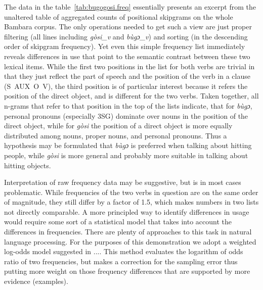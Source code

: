 \documentclass[12pt]{article}
\begin{document}
The data in the table~\ref{tab:bugogosi.freq} essentially presents an
excerpt from the unaltered table of aggregated counts of positional
skipgrams on the whole Bambara corpus. The only operations needed to
get such a view are just proper filtering (all lines including
\textit{gòsi\_v} and \textit{bùgɔ\_v}) and sorting (in the descending
order of skipgram frequency). Yet even this simple frequency list
immediately reveals differences in use that point to the semantic
contrast between these two lexical items. While the first two
positions in the list for both verbs are trivial in that they just
reflect the part of speech and the position of the verb in a clause
(\mbox{S AUX O V}), the third position is of particular interest
because it refers the position of the direct object, and is different
for the two verbs. Taken together, all n-grams that refer to that
position in the top of the lists indicate, that for \textit{bùgɔ},
personal pronouns (especially 3SG) dominate over nouns in the position
of the direct object, while for \textit{gòsi} the position of a direct
object is more equally distributed among nouns, proper nouns, and
personal pronouns. Thus a hypothesis may be formulated that
\textit{bùgɔ} is preferred when talking about hitting people, while
\textit{gòsi} is more general and probably more suitable in talking
about hitting objects.

Interpretation of raw frequency data may be suggestive, but is in most
cases problematic. While frequencies of the two verbs in question are
on the same order of magnitude, they still differ by a factor of 1.5,
which makes numbers in two lists not directly comparable. A more
principled way to identify differences in usage would require some
sort of a statistical model that takes into account the differences in
frequencies. There are plenty of approaches to this task in natural
language processing. For the purposes of this demonstration we adopt a
weighted log-odds model suggested in .... This method
evaluates the logarithm of odds ratio of two frequencies, but makes a
correction for the sampling error thus putting more weight on those
frequency differences that are supported by more evidence
(examples). 
\end{document}
